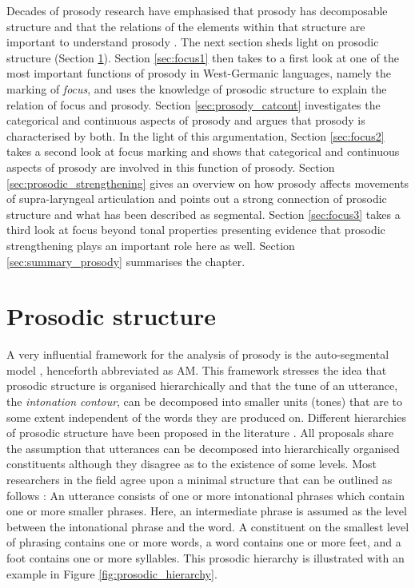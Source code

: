Decades of prosody research have emphasised that prosody has decomposable structure and that the relations of the elements within that structure are important to understand prosody \citep{Ladd2008, Arvaniti2011}. The next section sheds light on prosodic structure (Section \ref{sec:prosodic_structure}). Section \ref{sec:focus1} then takes to a first look at one of the most important functions of prosody in West-Germanic languages, namely the marking of \emph{focus}, and uses the knowledge of prosodic structure to explain the relation of focus and prosody. Section \ref{sec:prosody_catcont} investigates the categorical and continuous aspects of prosody and argues that prosody is characterised by both. In the light of this argumentation, Section \ref{sec:focus2} takes a second look at focus marking and shows that categorical and continuous aspects of prosody are involved in this function of prosody. Section \ref{sec:prosodic_strengthening} gives an overview on how prosody affects movements of supra-laryngeal articulation and points out a strong connection of prosodic structure and what has been described as segmental. Section \ref{sec:focus3} takes a third look at focus beyond tonal properties presenting evidence that prosodic strengthening plays an important role here as well. Section \ref{sec:summary_prosody} summarises the chapter.

\section{Prosodic structure}
\label{sec:prosodic_structure}

A very influential framework for the analysis of prosody is the auto-segmental model \citep{Pierrehumbert1980, Ladd2008}, henceforth abbreviated as AM. This framework stresses the idea that prosodic structure is organised hierarchically and that the tune of an utterance, the \emph{intonation contour}, can be decomposed into smaller units (tones) that are to some extent independent of the words they are produced on. Different hierarchies of prosodic structure have been proposed in the literature \citep{NesporVogel1986, PierrehumbertBeckman1988, Hayes1989, Selkirk1996, ShattuckHufnagelTurk1996}. All proposals share the assumption that utterances can be decomposed into hierarchically organised constituents although they disagree as to the existence of some levels. Most researchers in the field agree upon a minimal structure that can be outlined as follows \citep{Grice2006}: An utterance consists of one or more intonational phrases which contain one or more smaller phrases. Here, an intermediate phrase is assumed as the level between the intonational phrase and the word. A constituent on the smallest level of phrasing contains one or more words, a word contains one or more feet, and a foot contains one or more syllables. This prosodic hierarchy is illustrated with an example in Figure \ref{fig:prosodic_hierarchy}.

